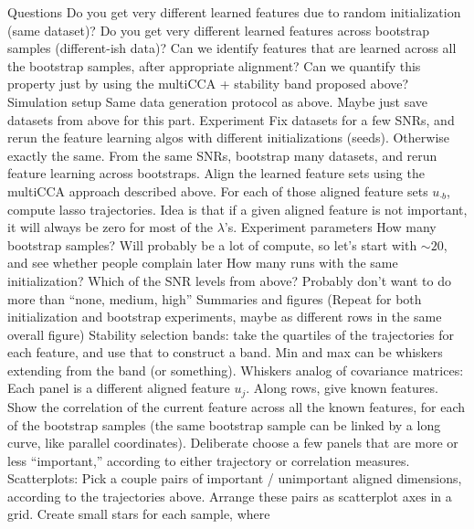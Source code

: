 \documentclass[11pt]{article}
\begin{document}
\begin{outline}
    \2 Questions
      \3 Do you get very different learned features due to random initialization
      (same dataset)? Do you get very different learned features across
      bootstrap samples (different-ish data)?
      \3 Can we identify features that are learned across all the bootstrap
      samples, after appropriate alignment? Can we quantify this property just
      by using the multiCCA + stability band proposed above?
    \2 Simulation setup
      \3 Same data generation protocol as above. Maybe just save datasets from
      above for this part.
      \3 Experiment
        \4 Fix datasets for a few SNRs, and rerun the feature learning algos
        with different initializations (seeds). Otherwise exactly the same.
        \4 From the same SNRs, bootstrap many datasets, and rerun feature
        learning across bootstraps.
        \4 Align the learned feature sets using the multiCCA approach described
        above. For each of those aligned feature sets $u_{\cdot b}$, compute
        lasso trajectories. Idea is that if a given aligned feature is not
        important, it will always be zero for most of the $\lambda$'s.
      \3 Experiment parameters
        \4 How many bootstrap samples? Will probably be a lot of compute, so
        let's start with $\sim 20$, and see whether people complain later
        \4 How many runs with the same initialization?
        \4 Which of the SNR levels from above? Probably don't want to do more
        than ``none, medium, high''
      \3 Summaries and figures
        \4 (Repeat for both initialization and bootstrap experiments, maybe as
        different rows in the same overall figure)
        \4 Stability selection bands: take the quartiles of the trajectories for
        each feature, and use that to construct a band. Min and max can be
        whiskers extending from the band (or something).
        \4 Whiskers analog of covariance matrices: Each panel is a different
        aligned feature $u_{j}$. Along rows, give known features. Show the
        correlation of the current feature across all the known features, for
        each of the bootstrap samples (the same bootstrap sample can be linked
        by a long curve, like parallel coordinates). Deliberate choose a few
        panels that are more or less ``important,'' according to either
        trajectory or correlation measures.
        \4 Scatterplots: Pick a couple pairs of important / unimportant aligned
        dimensions, according to the trajectories above. Arrange these pairs as
        scatterplot axes in a grid. Create small stars for each sample, where

\end{outline}
\end{document}
